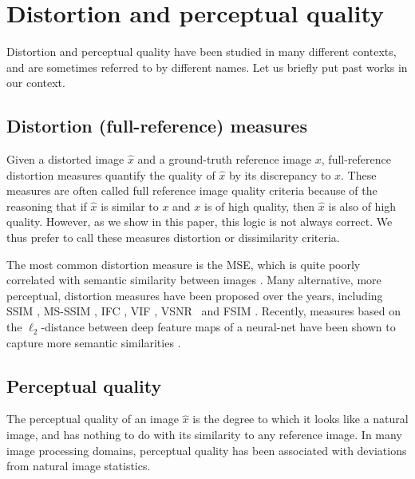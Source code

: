 \section{Distortion and perceptual quality}\label{sec:related}

Distortion and perceptual quality have been studied in many different contexts, and are sometimes referred to by different names. Let us briefly put past works in our context.

\subsection{Distortion (full-reference) measures}

Given a distorted image $\hat{x}$ and a ground-truth reference image $x$, full-reference distortion measures quantify the quality of $\hat{x}$ by its discrepancy to $x$. These measures are often called full reference image quality criteria because of the reasoning that if $\hat{x}$ is similar to $x$ and $x$ is of high quality, then $\hat{x}$ is also of high quality. However, as we show in this paper, this logic is not always correct. We thus prefer to call these measures distortion or dissimilarity criteria.

The most common distortion measure is the MSE, which is quite poorly correlated with semantic similarity between images \cite{wang2009mean}. Many alternative, more perceptual, distortion measures have been proposed over the years, including SSIM \cite{wang2004image}, MS-SSIM \cite{wang2003multiscale}, IFC \cite{sheikh2005information}, VIF \cite{sheikh2006image}, VSNR~\cite{chandler2007vsnr} and FSIM \cite{zhang2011fsim}. Recently, measures based on the $\ell_2$-distance between deep feature maps of a neural-net have been shown to capture more semantic similarities %
\cite{johnson2016perceptual,ledig2016photo,zhang2018unreasonable}.

\subsection{Perceptual quality} \label{sec:RelatedWorkPerceptualQuality}
The perceptual quality of an image $\hat{x}$ is the degree to which it looks like a natural image, and has nothing to do with its similarity to any reference image. In many image processing domains, perceptual quality has been associated with deviations from natural image statistics.

